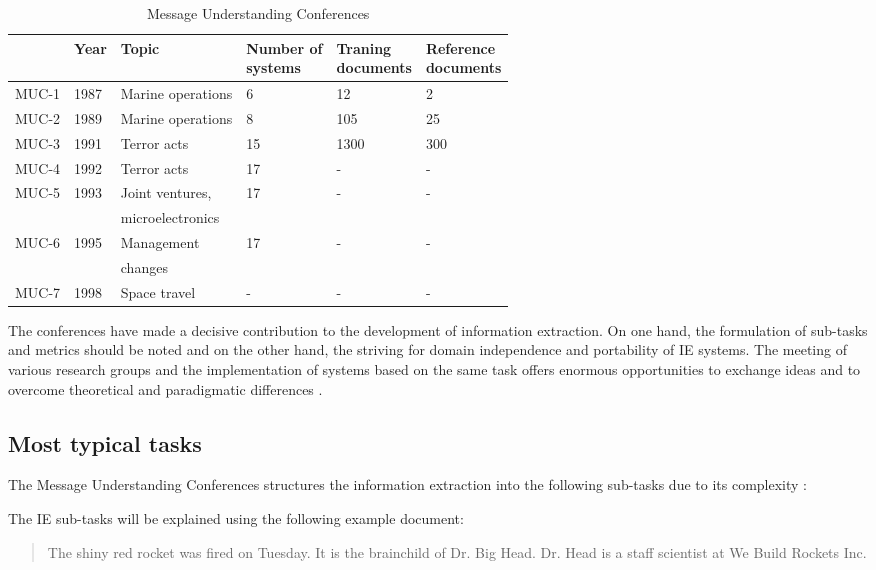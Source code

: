 \begin{table}[H]
\centering
\begin{tabular*}{\textwidth}{ l l l l l l }
	\toprule
	& Year & Topic & \shortstack{Number of \\ systems} & \shortstack{Traning \\ documents} & \shortstack{Reference \\ documents} \\
	\midrule
	MUC-1 & 1987 & Marine operations & 6 & 12 & 2 \\
	MUC-2 & 1989 & Marine operations & 8 & 105 & 25 \\
	MUC-3 & 1991 & Terror acts & 15 & 1300 & 300 \\
	MUC-4 & 1992 & Terror acts & 17 & - & - \\
	MUC-5 & 1993 & Joint ventures, & 17 & - & - \\
	& & microelectronics & & & \\
	MUC-6 & 1995 & Management & 17 & - & - \\
	& & changes & & & \\
	MUC-7 & 1998 & Space travel & - & - & - \\
	\bottomrule
\end{tabular*}
\caption{Message Understanding Conferences}
\end{table}

The conferences have made a decisive contribution to the development of information extraction. On one hand, the formulation of sub-tasks and metrics should be noted and on the other hand, the striving for domain independence and portability of \gls{IE} systems. The meeting of various research groups and the implementation of systems based on the same task offers enormous opportunities to exchange ideas and to overcome theoretical and paradigmatic differences \cite{Cimiano:2003}\cite{Lehnert:1994}.

\newpage
\subsection{Most typical tasks}

The Message Understanding Conferences structures the information extraction into the following sub-tasks due to its complexity \cite{Carstensen:2010}\cite{Lavelli:2008}:

The \gls{IE} sub-tasks will be explained using the following example document:

\begin{quote}
The shiny red rocket was fired on Tuesday. It is the brainchild of Dr. Big Head. Dr. Head is a staff scientist at We Build Rockets Inc.
\cite{Cunningham:2005}
\end{quote}

